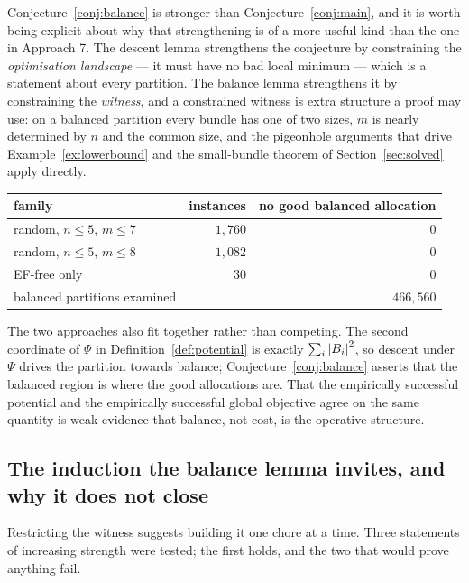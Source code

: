 Conjecture~\ref{conj:balance} is stronger than Conjecture~\ref{conj:main}, and it
is worth being explicit about why that strengthening is of a more useful kind
than the one in Approach 7. The descent lemma strengthens the conjecture by
constraining the \emph{optimisation landscape} --- it must have no bad local
minimum --- which is a statement about every partition. The balance lemma
strengthens it by constraining the \emph{witness}, and a constrained witness is
extra structure a proof may use: on a balanced partition every bundle has one of
two sizes, $m$ is nearly determined by $n$ and the common size, and the pigeonhole
arguments that drive Example~\ref{ex:lowerbound} and the small-bundle theorem of
Section~\ref{sec:solved} apply directly.

\begin{center}
\begin{tabular}{lrr}
\toprule
family & instances & no good balanced allocation \\
\midrule
random, $n \le 5$, $m \le 7$                & $1{,}760$ & $0$ \\
random, $n \le 5$, $m \le 8$                & $1{,}082$ & $0$ \\
EF-free only                                & $30$      & $0$ \\
\midrule
balanced partitions examined                & \multicolumn{2}{r}{$466{,}560$} \\
\bottomrule
\end{tabular}
\end{center}

The two approaches also fit together rather than competing. The second
coordinate of $\Psi$ in Definition~\ref{def:potential} is exactly
$\sum_i \left\lvert B_i\right\rvert^2$, so descent under $\Psi$ drives the partition towards
balance; Conjecture~\ref{conj:balance} asserts that the balanced region is where
the good allocations are. That the empirically successful potential and the
empirically successful global objective agree on the same quantity is weak
evidence that balance, not cost, is the operative structure.

\subsection{The induction the balance lemma invites, and why it does not close}
\label{sec:approach8-induction}

Restricting the witness suggests building it one chore at a time. Three
statements of increasing strength were tested; the first holds, and the two that
would prove anything fail.

